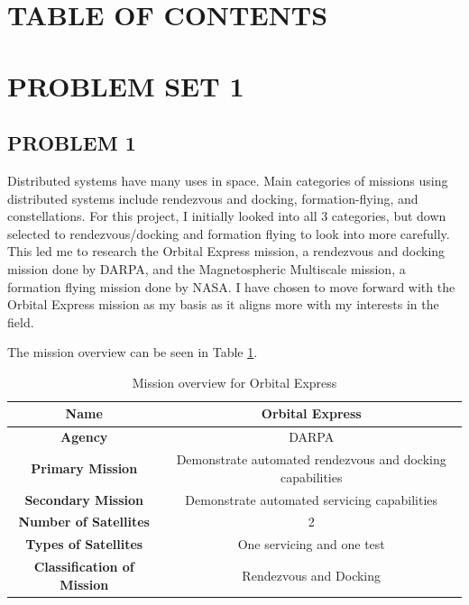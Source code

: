 \documentclass[12pt,a4paper,notitlepage]{article}
\begin{document}
\newpage
\section*{\Large TABLE OF CONTENTS}
\makeatletter
{}
\makeatother
\newpage


\section{\Large PROBLEM SET 1}
\subsection{PROBLEM 1}
Distributed systems have many uses in space. Main categories of missions using distributed systems include rendezvous and docking, formation-flying, and constellations. For this project, I initially looked into all 3 categories, but down selected to rendezvous/docking and formation flying to look into more carefully. This led me to research the Orbital Express mission, a rendezvous and docking mission done by DARPA, and the Magnetospheric Multiscale mission, a formation flying mission done by NASA. I have chosen to move forward with the Orbital Express mission as my basis as it aligns more with my interests in the field. 

The mission overview can be seen in Table \ref{table:mission_overview}.

\begin{table}[h!]
\begin{center}
\begin{tabular}{ |c|c| }
 \hline
 \textbf{Name} & Orbital Express \\ \hline
 \textbf{Agency} & DARPA \\ \hline
 \textbf{Primary Mission} & Demonstrate automated rendezvous and docking capabilities \\ \hline
 \textbf{Secondary Mission} & Demonstrate automated servicing capabilities \\ \hline
 \textbf{Number of Satellites} & 2 \\ \hline
 \textbf{Types of Satellites} & One servicing and one test \\ \hline
 \textbf{Classification of Mission} & Rendezvous and Docking \\
 \hline
\end{tabular}
\caption{Mission overview for Orbital Express}
\label{table:mission_overview}
\end{center}
\end{table}
\end{document}
